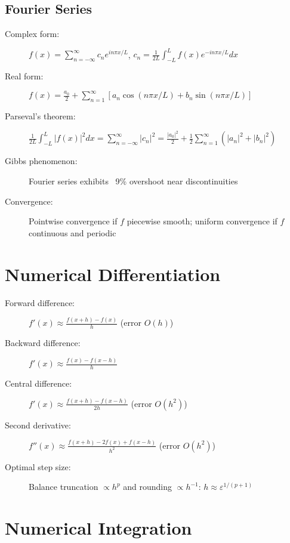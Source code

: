 \documentclass[a4paper,10pt,landscape]{article}
\newcommand{\ep}{\varepsilon}
\begin{document}
\begin{multicols*}{3}
    \subsection*{Fourier Series}
    \begin{description}
        \item[Complex form:] $f(x) = \sum_{n=-\infty}^{\infty} c_n e^{in\pi x/L}$, $c_n = \frac{1}{2L}\int_{-L}^L f(x)e^{-in\pi x/L}dx$
        \item[Real form:] $f(x) = \frac{a_0}{2} + \sum_{n=1}^{\infty}[a_n\cos(n\pi x/L) + b_n\sin(n\pi x/L)]$
        \item[Parseval's theorem:] $\frac{1}{2L}\int_{-L}^L |f(x)|^2dx = \sum_{n=-\infty}^{\infty}|c_n|^2 = \frac{|a_0|^2}{2} + \frac{1}{2}\sum_{n=1}^{\infty}(|a_n|^2 + |b_n|^2)$
        \item[Gibbs phenomenon:] Fourier series exhibits ~9\% overshoot near discontinuities
        \item[Convergence:] Pointwise convergence if $f$ piecewise smooth; uniform convergence if $f$ continuous and periodic
    \end{description}

    \section*{Numerical Differentiation}
    \begin{description}
        \item[Forward difference:] $f'(x) \approx \frac{f(x+h)-f(x)}{h}$ (error $O(h)$)
        \item[Backward difference:] $f'(x) \approx \frac{f(x)-f(x-h)}{h}$
        \item[Central difference:] $f'(x) \approx \frac{f(x+h)-f(x-h)}{2h}$ (error $O(h^2)$)
        \item[Second derivative:] $f''(x) \approx \frac{f(x+h)-2f(x)+f(x-h)}{h^2}$ (error $O(h^2)$)
        \item[Optimal step size:] Balance truncation $\propto h^p$ and rounding $\propto h^{-1}$: $h \approx \ep^{1/(p+1)}$
    \end{description}

    \section*{Numerical Integration}

\end{multicols*}
\end{document}
